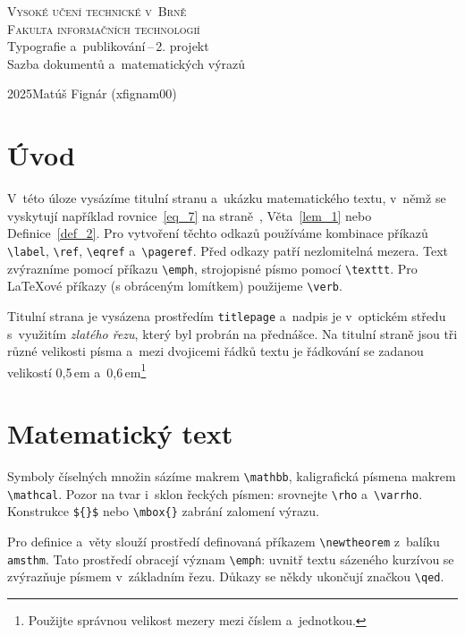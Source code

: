 \documentclass[11pt, twocolumn, a4paper]{article}
\theoremstyle{plain}
\theoremstyle{plain}
\begin{document}
\begin{titlepage}
    \begin{center}
        \Huge
        \textsc{Vysoké učení technické v~Brně\\
        \huge{Fakulta informačních technologií}}\\      
        {\huge{Typografie a~publikování\,--\,2. projekt\\
        Sazba dokumentů a~matematických výrazů}}\\  
    \end{center}
    {\Large2025\hfill Matúš Fignár (xfignam00)}
\end{titlepage}

\section*{Úvod}
V~této úloze vysázíme titulní stranu a~ukázku matematického textu,
v~němž se vyskytují například rovnice~\eqref{eq_7} na straně~\pageref{pg_one}, Věta~\ref{lem_1} nebo Definice~\ref{def_2}.
Pro vytvoření těchto odkazů používáme kombinace příkazů
\verb|\label|, \verb|\ref|, \verb|\eqref| a~\verb|\pageref|.
Před odkazy patří nezlomitelná mezera.
Text zvýrazníme pomocí příkazu \verb|\emph|, strojopisné písmo pomocí \verb|\texttt|.
Pro \LaTeX{}ové příkazy (s obráceným lomítkem) použijeme \verb|\verb|.

Titulní strana je vysázena prostředím \texttt{titlepage} a~nadpis je v~optickém středu
s~využitím \emph{zlatého řezu}, který byl probrán na přednášce.
Na titulní straně jsou tři různé velikosti písma a~mezi dvojicemi řádků textu
je řádkování se zadanou  velikostí 0{,}5\,em a~0{,}6\,em\footnote{Použijte správnou velikost mezery mezi číslem a~jednotkou.}


\section{Matematický text}
Symboly číselných množin sázíme makrem \verb|\mathbb|,
kaligrafická písmena  makrem \verb|\mathcal|.
Pozor na tvar i~sklon řeckých písmen: srovnejte \verb|\rho| a~\verb|\varrho|.
Konstrukce \verb|${}$| nebo \verb|\mbox{}| zabrání zalomení výrazu.

Pro definice a~věty slouží prostředí definovaná příkazem \verb|\newtheorem| z~balíku \texttt{amsthm}.
Tato prostředí obracejí význam \verb|\emph|:
uvnitř textu sázeného kurzívou se zvýrazňuje písmem v~základním řezu.
Důkazy se někdy ukončují značkou \verb|\qed|.
\end{document}
